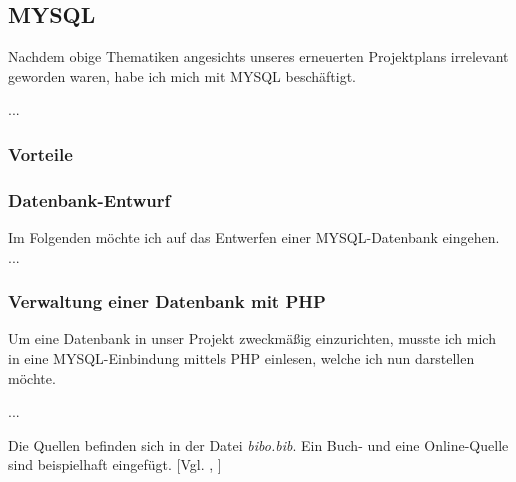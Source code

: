 \documentclass[12pt,a4paper,bibliography=totocnumbered,listof=totocnumbered]{scrartcl}
\begin{document}
\pagebreak
\subsection{MYSQL}
Nachdem obige Thematiken angesichts unseres erneuerten Projektplans irrelevant geworden waren, habe ich mich 
mit MYSQL beschäftigt.

...
\subsubsection{Vorteile}

\subsubsection{Datenbank-Entwurf}
Im Folgenden möchte ich auf das Entwerfen einer MYSQL-Datenbank eingehen.
...



\subsubsection{Verwaltung einer Datenbank mit PHP}
Um eine Datenbank in unser Projekt zweckmäßig einzurichten, musste ich mich in eine MYSQL-Einbindung mittels PHP einlesen, welche ich nun darstellen möchte.

...

Die Quellen befinden sich in der Datei \textit{bibo.bib}. Ein Buch- und eine Online-Quelle sind beispielhaft eingefügt. [Vgl. \cite{buch}, \cite{online}]

\pagebreak

\end{document}
